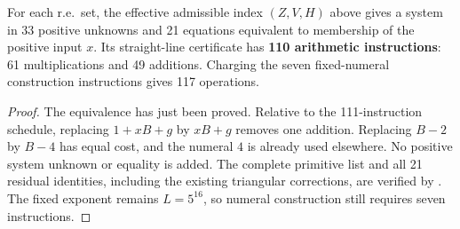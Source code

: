 \begin{theorem}\label{thm:best110}
For each r.e.\ set, the effective admissible index $(Z,V,H)$ above
gives a system in 33 positive unknowns and 21 equations equivalent
to membership of the positive input $x$. Its straight-line certificate
has \textbf{110 arithmetic instructions}: 61 multiplications and
49 additions. Charging the seven fixed-numeral construction instructions
gives 117 operations.
\end{theorem}
\begin{proof}
The equivalence has just been proved. Relative to the 111-instruction
schedule, replacing $1+xB+g$ by $xB+g$ removes one addition.
Replacing $B-2$ by $B-4$ has equal cost, and the numeral $4$ is
already used elsewhere. No positive system unknown or equality is
added. The complete primitive list and all 21 residual identities,
including the existing triangular corrections, are verified by
. The fixed exponent remains
$L=5^{16}$, so numeral construction still requires seven instructions.
\end{proof}
